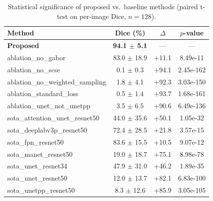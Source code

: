 \begin{table}[t]
\centering
\caption{Statistical significance of proposed vs.\ baseline methods (paired t-test on per-image Dice, $n=128$).}
\label{tab:significance}
\begin{tabular}{lccc}
\toprule
Method & Dice (\%) & $\Delta$ & $p$-value \\
\midrule
\textbf{Proposed} & \textbf{94.1 $\pm$ 5.1} & --- & --- \\
ablation\_no\_gabor & 83.0 $\pm$ 18.9 & +11.1 & 8.49e-11 \\
ablation\_no\_scse & 0.1 $\pm$ 0.3 & +94.1 & 2.45e-162 \\
ablation\_no\_weighted\_sampling & 1.8 $\pm$ 4.1 & +92.3 & 3.03e-150 \\
ablation\_standard\_loss & 0.5 $\pm$ 1.4 & +93.7 & 1.68e-161 \\
ablation\_unet\_not\_unetpp & 3.5 $\pm$ 6.5 & +90.6 & 6.49e-136 \\
sota\_attention\_unet\_resnet50 & 44.0 $\pm$ 35.6 & +50.1 & 1.05e-32 \\
sota\_deeplabv3p\_resnet50 & 72.4 $\pm$ 28.5 & +21.8 & 3.57e-15 \\
sota\_fpn\_resnet50 & 83.6 $\pm$ 15.5 & +10.5 & 9.07e-12 \\
sota\_manet\_resnet50 & 19.0 $\pm$ 18.7 & +75.1 & 8.98e-78 \\
sota\_unet\_resnet34 & 47.9 $\pm$ 31.0 & +46.2 & 1.89e-35 \\
sota\_unet\_resnet50 & 12.0 $\pm$ 13.7 & +82.1 & 6.83e-100 \\
sota\_unetpp\_resnet50 & 8.3 $\pm$ 12.6 & +85.9 & 3.05e-105 \\
\bottomrule
\end{tabular}
\end{table}